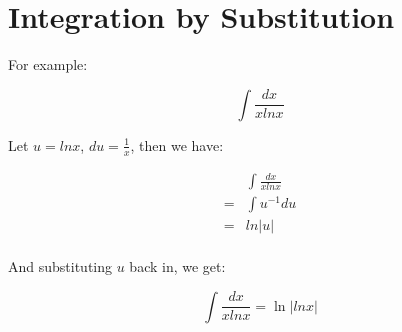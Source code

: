 \documentclass{article}
\begin{document}
\newpage
\section{Integration by Substitution}

For example:

\[
\int \frac{dx}{xlnx}
\]

Let $u=lnx$, $du=\frac{1}{x}$, then we have:

\begin{align*}
  &\int \frac{dx}{xlnx} \\
  = &\int u^{-1}du \\
  = &ln \left| u \right| \\
\end{align*}

And substituting $u$ back in, we get:

\[
\int \frac{dx}{xlnx} = \ln \left| lnx \right|
\]
\end{document}
